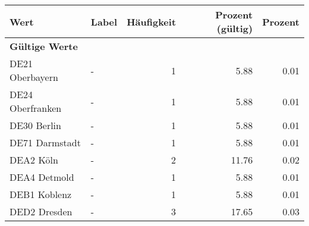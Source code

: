      \begin{longtable}{Xlrrr}
     \toprule
     \textbf{Wert} & \textbf{Label} & \textbf{Häufigkeit} & \textbf{Prozent (gültig)} & \textbf{Prozent} \\
     \endhead
     \midrule
     \multicolumn{5}{l}{\textbf{Gültige Werte}}\\

     \multicolumn{1}{X}{DE21 Oberbayern} &
     - &
     \num{1} &
     \num[round-mode=places,round-precision=2]{5.88} &
     \num[round-mode=places,round-precision=2]{0.01} \\

     \multicolumn{1}{X}{DE24 Oberfranken} &
     - &
     \num{1} &
     \num[round-mode=places,round-precision=2]{5.88} &
     \num[round-mode=places,round-precision=2]{0.01} \\

     \multicolumn{1}{X}{DE30 Berlin} &
     - &
     \num{1} &
     \num[round-mode=places,round-precision=2]{5.88} &
     \num[round-mode=places,round-precision=2]{0.01} \\

     \multicolumn{1}{X}{DE71 Darmstadt} &
     - &
     \num{1} &
     \num[round-mode=places,round-precision=2]{5.88} &
     \num[round-mode=places,round-precision=2]{0.01} \\

     \multicolumn{1}{X}{DEA2 Köln} &
     - &
     \num{2} &
     \num[round-mode=places,round-precision=2]{11.76} &
     \num[round-mode=places,round-precision=2]{0.02} \\

     \multicolumn{1}{X}{DEA4 Detmold} &
     - &
     \num{1} &
     \num[round-mode=places,round-precision=2]{5.88} &
     \num[round-mode=places,round-precision=2]{0.01} \\

     \multicolumn{1}{X}{DEB1 Koblenz} &
     - &
     \num{1} &
     \num[round-mode=places,round-precision=2]{5.88} &
     \num[round-mode=places,round-precision=2]{0.01} \\

     \multicolumn{1}{X}{DED2 Dresden} &
     - &
     \num{3} &
     \num[round-mode=places,round-precision=2]{17.65} &
     \num[round-mode=places,round-precision=2]{0.03} \\


\end{longtable}
